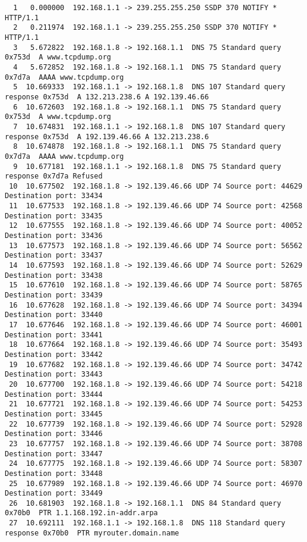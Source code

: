 \documentclass[a4paper]{report} %
\begin{document}
\begin{lstlisting}
  1   0.000000  192.168.1.1 -> 239.255.255.250 SSDP 370 NOTIFY * HTTP/1.1 
  2   0.211974  192.168.1.1 -> 239.255.255.250 SSDP 370 NOTIFY * HTTP/1.1 
  3   5.672822  192.168.1.8 -> 192.168.1.1  DNS 75 Standard query 0x753d  A www.tcpdump.org
  4   5.672852  192.168.1.8 -> 192.168.1.1  DNS 75 Standard query 0x7d7a  AAAA www.tcpdump.org
  5  10.669333  192.168.1.1 -> 192.168.1.8  DNS 107 Standard query response 0x753d  A 132.213.238.6 A 192.139.46.66
  6  10.672603  192.168.1.8 -> 192.168.1.1  DNS 75 Standard query 0x753d  A www.tcpdump.org
  7  10.674831  192.168.1.1 -> 192.168.1.8  DNS 107 Standard query response 0x753d  A 192.139.46.66 A 132.213.238.6
  8  10.674878  192.168.1.8 -> 192.168.1.1  DNS 75 Standard query 0x7d7a  AAAA www.tcpdump.org
  9  10.677181  192.168.1.1 -> 192.168.1.8  DNS 75 Standard query response 0x7d7a Refused
 10  10.677502  192.168.1.8 -> 192.139.46.66 UDP 74 Source port: 44629  Destination port: 33434
 11  10.677533  192.168.1.8 -> 192.139.46.66 UDP 74 Source port: 42568  Destination port: 33435
 12  10.677555  192.168.1.8 -> 192.139.46.66 UDP 74 Source port: 40052  Destination port: 33436
 13  10.677573  192.168.1.8 -> 192.139.46.66 UDP 74 Source port: 56562  Destination port: 33437
 14  10.677593  192.168.1.8 -> 192.139.46.66 UDP 74 Source port: 52629  Destination port: 33438
 15  10.677610  192.168.1.8 -> 192.139.46.66 UDP 74 Source port: 58765  Destination port: 33439
 16  10.677628  192.168.1.8 -> 192.139.46.66 UDP 74 Source port: 34394  Destination port: 33440
 17  10.677646  192.168.1.8 -> 192.139.46.66 UDP 74 Source port: 46001  Destination port: 33441
 18  10.677664  192.168.1.8 -> 192.139.46.66 UDP 74 Source port: 35493  Destination port: 33442
 19  10.677682  192.168.1.8 -> 192.139.46.66 UDP 74 Source port: 34742  Destination port: 33443
 20  10.677700  192.168.1.8 -> 192.139.46.66 UDP 74 Source port: 54218  Destination port: 33444
 21  10.677721  192.168.1.8 -> 192.139.46.66 UDP 74 Source port: 54253  Destination port: 33445
 22  10.677739  192.168.1.8 -> 192.139.46.66 UDP 74 Source port: 52928  Destination port: 33446
 23  10.677757  192.168.1.8 -> 192.139.46.66 UDP 74 Source port: 38708  Destination port: 33447
 24  10.677775  192.168.1.8 -> 192.139.46.66 UDP 74 Source port: 58307  Destination port: 33448
 25  10.677989  192.168.1.8 -> 192.139.46.66 UDP 74 Source port: 46970  Destination port: 33449
 26  10.681903  192.168.1.8 -> 192.168.1.1  DNS 84 Standard query 0x70b0  PTR 1.1.168.192.in-addr.arpa
 27  10.692111  192.168.1.1 -> 192.168.1.8  DNS 118 Standard query response 0x70b0  PTR myrouter.domain.name

\end{lstlisting}
\end{document}
